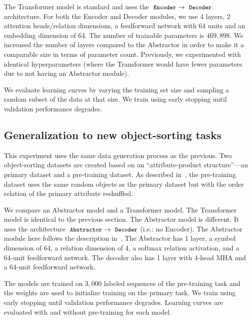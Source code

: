 The Transformer model is standard and uses the $\module{Encoder} \to \module{Decoder}$ architecture. For both the Encoder and Decoder modules, we use 4 layers, 2 attention heads/relation dimensions, a feedforward network with 64 units and an embedding dimension of 64. The number of trainable parameters is $469,898$. We increased the number of layers compared to the Abstractor in order to make it a comparable size in terms of parameter count. Previously, we experimented with identical hyperparameters (where the Transformer would have fewer parameters due to not having an Abstractor module).

We evaluate learning curves by varying the training set size and sampling a random subset of the data at that size. We train using early stopping until validation performance degrades.

\subsection{Generalization to new object-sorting tasks}\label{ssec:supp_exp_object_sorting_generalization}
This experiment uses the same data generation process as the previous. Two object-sorting datasets are created based on an ``attribute-product structure''---an primary dataset and a pre-training dataset. As described in~, the pre-training dataset uses the same random objects as the primary dataset but with the order relation of the primary attribute reshuffled.

We compare an Abstractor model and a Transformer model. The Transformer model is identical to the previous section. The Abstractor model is different. It uses the architecture $\module{Abstractor} \to \module{Decoder}$ (i.e.: no Encoder). The Abstractor module here follows the description in~. The Abstractor has 1 layer, a symbol dimension of 64, a relation dimension of 4, a softmax relation activation, and a 64-unit feedforward network. The decoder also has 1 layer with 4-head MHA and a 64-unit feedforward network.

The models are trained on $3,000$ labeled sequences of the pre-training task and the weights are used to initialize training on the primary task. We train using early stopping until validation performance degrades. Learning curves are evaluated with and without pre-training for each model.

